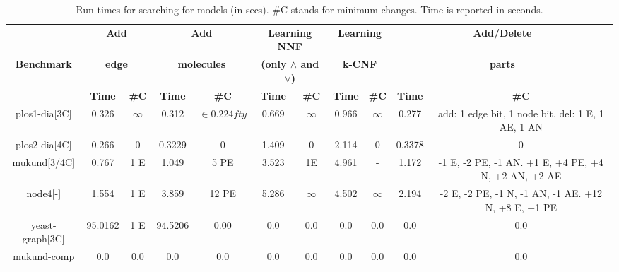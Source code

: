 \begin{table}[t]
  \centering
  \begin{tabular}[t]{|c@{}|@{}c@{}|@{}c@{}|@{}c@{}|@{}c@{}|@{}c@{}|@{}c@{}|@{}c@{}|@{}c@{}|@{}c@{}|@{}c@{}|}\hline
    {\multirow{2}{*} \textbf{}}  & \multicolumn{2}{c|}{\textbf{Add}} & \multicolumn{2}{c|}{\textbf{Add}} & \multicolumn{2}{c|}{\textbf{Learning NNF}}  &  \multicolumn{2}{c|}{\textbf{Learning}} &  \multicolumn{2}{c|}{\textbf{Add/Delete}} \\
    {\multirow{2}{*} \textbf{Benchmark}}  & \multicolumn{2}{c|}{\textbf{edge}} & \multicolumn{2}{c|}{\textbf{molecules}} & \multicolumn{2}{c|}{\textbf{(only $\land$ and $\lor$)}}  &  \multicolumn{2}{c|}{\textbf{k-CNF}} &  \multicolumn{2}{c|}{\textbf{parts}} \\
    \cline{2-11}
    {} & {\textbf{Time}} & {\textbf{\#C}} & {\textbf{Time}} & {\textbf{\#C}} & {\textbf{Time}} & {\textbf{\#C}} & {\textbf{Time}} & {\textbf{\#C}} & {\textbf{Time}} & {\textbf{\#C}} \\
    \hline
    
    plos1-dia[3C]& 0.326 &$\infty$& 0.312 &$\in0.224fty$& 0.669 & $\infty$ & 0.966 &$\infty$& 0.277 & add: 1 edge bit, 1 node bit, del: 1 E, 1 AE, 1 AN\\\hline
    plos2-dia[4C] & 0.266 & 0   & 0.3229 & 0  & 1.409  & 0 & 2.114 & 0 &  0.3378 & 0 \\\hline
    mukund[3/4C]  & 0.767 & 1 E  & 1.049 & 5 PE & 3.523 & 1E & 4.961 & - & 1.172  & -1 E, -2 PE, -1 AN. +1 E, +4 PE, +4 N, +2 AN, +2 AE \\\hline
    node4[-]  & 1.554  & 1 E   &  3.859 & 12 PE  &  5.286  & $\infty$ & 4.502 &$\infty$& 2.194  & -2 E, -2 PE, -1 N, -1 AN, -1 AE. +12 N, +8 E, +1 PE \\\hline
    yeast-graph[3C]   & 95.0162    & 1 E   & 94.5206    & 0.00   & 0.0         & 0.0      & 0.0   & 0.0    & 0.0    & 0.0 \\\hline
    mukund-comp   & 0.0    & 0.0    & 0.0    & 0.0    & 0.0         & 0.0      & 0.0   & 0.0    & 0.0    & 0.0\\\hline
  \end{tabular}
  \caption{Run-times for searching for models (in secs). \#C  stands for minimum changes.
  Time is reported in seconds.}
  \label{tab:qf-graph}
\end{table}


